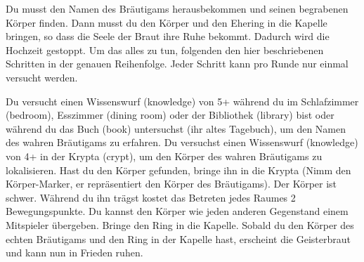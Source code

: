 





Du musst den Namen des Bräutigams herausbekommen und seinen begrabenen Körper finden. Dann musst du den Körper und den Ehering in die Kapelle bringen, so dass die Seele der Braut ihre Ruhe bekommt. Dadurch wird die Hochzeit gestoppt.
Um das alles zu tun, folgenden den hier beschriebenen Schritten in der genauen Reihenfolge. Jeder Schritt kann pro Runde nur einmal versucht werden.
  \begin{itemize}
        \bitem Du versucht einen Wissenswurf (knowledge) von 5+ während du im Schlafzimmer (bedroom), Esszimmer (dining room) oder der Bibliothek (library) bist oder während du das Buch (book) untersuchst (ihr altes Tagebuch), um den Namen des wahren Bräutigams zu erfahren.
        \bitem Du versuchst einen Wissenswurf (knowledge) von 4+ in der Krypta (crypt), um den Körper des wahren Bräutigams zu lokalisieren.
        \bitem Hast du den Körper gefunden, bringe ihn in die Krypta (Nimm den Körper-Marker, er repräsentiert den Körper des Bräutigams). Der Körper ist schwer. Während du ihn trägst kostet das Betreten jedes Raumes 2 Bewegungspunkte. Du kannst den Körper wie jeden anderen Gegenstand einem Mitspieler übergeben.
        \bitem  Bringe den Ring in die Kapelle. Sobald du den Körper des echten Bräutigams und den Ring in der Kapelle hast, erscheint die Geisterbraut und kann nun in Frieden ruhen.
    \end{itemize}

